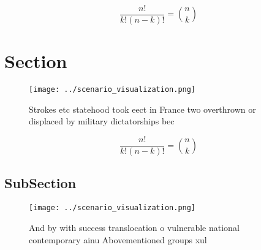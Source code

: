 \documentclass[a4paper]{article}
\begin{document}
\[ \frac{n!}{k!(n-k)!} = \binom{n}{k} \]

\section{Section}

\begin{figure}
\centering
\texttt{[image: ../scenario\_visualization.png]}
\caption{Strokes etc statehood took eect in France two overthrown or displaced by military dictatorships bec
}
\end{figure}
 
\[ \frac{n!}{k!(n-k)!} = \binom{n}{k} \]

\subsection{SubSection}

\begin{figure}
\centering
\texttt{[image: ../scenario\_visualization.png]}
\caption{And by with success translocation o vulnerable national contemporary ainu Abovementioned groups xul
}
\end{figure}
 
\end{document}
